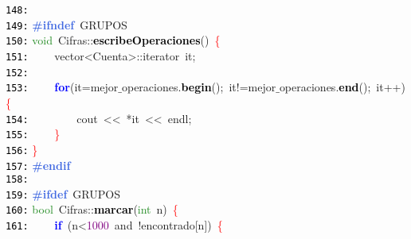 \documentclass[a4paper,10pt]{scrartcl}
\begin{document}
{   \mbox{}\texttt{\textcolor{Black}{148:}}  \\
   \mbox{}\texttt{\textcolor{Black}{149:}} \textbf{\textcolor{RoyalBlue}{\#ifndef}}\ GRUPOS \\
   \mbox{}\texttt{\textcolor{Black}{150:}} \textcolor{ForestGreen}{void}\ Cifras\textcolor{BrickRed}{::}\textbf{\textcolor{Black}{escribeOperaciones}}\textcolor{BrickRed}{()}\ \textcolor{Red}{\{}\ \ \ \  \\
   \mbox{}\texttt{\textcolor{Black}{151:}} \ \ \ \ vector\textcolor{BrickRed}{\textless{}}Cuenta\textcolor{BrickRed}{\textgreater{}::}\textcolor{TealBlue}{iterator}\ it\textcolor{BrickRed}{;} \\
   \mbox{}\texttt{\textcolor{Black}{152:}} \ \  \\
   \mbox{}\texttt{\textcolor{Black}{153:}} \ \ \ \ \textbf{\textcolor{Blue}{for}}\textcolor{BrickRed}{(}it\textcolor{BrickRed}{=}mejor$\_$operaciones\textcolor{BrickRed}{.}\textbf{\textcolor{Black}{begin}}\textcolor{BrickRed}{();}\ it\textcolor{BrickRed}{!=}mejor$\_$operaciones\textcolor{BrickRed}{.}\textbf{\textcolor{Black}{end}}\textcolor{BrickRed}{();}\ it\textcolor{BrickRed}{++)}\textcolor{Red}{\{} \\
   \mbox{}\texttt{\textcolor{Black}{154:}} \ \ \ \ \ \ \ \ cout\ \textcolor{BrickRed}{\textless{}\textless{}}\ \textcolor{BrickRed}{*}it\ \textcolor{BrickRed}{\textless{}\textless{}}\ endl\textcolor{BrickRed}{;} \\
   \mbox{}\texttt{\textcolor{Black}{155:}} \ \ \ \ \textcolor{Red}{\}} \\
   \mbox{}\texttt{\textcolor{Black}{156:}} \textcolor{Red}{\}} \\
   \mbox{}\texttt{\textcolor{Black}{157:}} \textbf{\textcolor{RoyalBlue}{\#endif}} \\
   \mbox{}\texttt{\textcolor{Black}{158:}}  \\
   \mbox{}\texttt{\textcolor{Black}{159:}} \textbf{\textcolor{RoyalBlue}{\#ifdef}}\ GRUPOS \\
   \mbox{}\texttt{\textcolor{Black}{160:}} \textcolor{ForestGreen}{bool}\ Cifras\textcolor{BrickRed}{::}\textbf{\textcolor{Black}{marcar}}\textcolor{BrickRed}{(}\textcolor{ForestGreen}{int}\ n\textcolor{BrickRed}{)}\ \textcolor{Red}{\{} \\
   \mbox{}\texttt{\textcolor{Black}{161:}} \ \ \ \ \textbf{\textcolor{Blue}{if}}\ \textcolor{BrickRed}{(}n\textcolor{BrickRed}{\textless{}}\textcolor{Purple}{1000}\ and\ \textcolor{BrickRed}{!}encontrado\textcolor{BrickRed}{[}n\textcolor{BrickRed}{])}\ \textcolor{Red}{\{} \\
}
\end{document}
